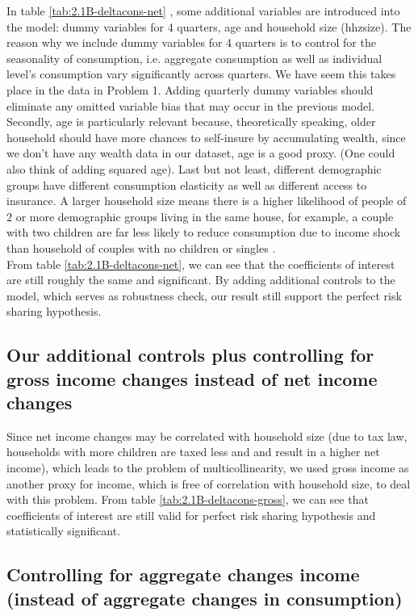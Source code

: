 \documentclass[12pt,a4paper]{article}
\begin{document}
In table \ref{tab:2.1B-deltacons-net} , some additional variables are introduced into the model: dummy variables for 4 quarters, age and household size (hhzsize). The reason why we include dummy variables for 4 quarters is to control for the seasonality of consumption, i.e. aggregate consumption as well as individual level's consumption vary significantly across quarters. We have seem this takes place in the data in Problem 1. Adding quarterly dummy variables should eliminate any omitted variable bias that may occur in the previous model. Secondly, age is particularly relevant because, theoretically speaking, older household should have more chances to self-insure by accumulating wealth, since we don't have any wealth data in our dataset, age is a good proxy. (One could also think of adding squared age). Last but not least, different demographic groups have different consumption elasticity as well as different access to insurance. A larger household size means there is a higher likelihood of people of 2 or more demographic groups living in the same house, for example, a couple with two children are far less likely to reduce consumption due to income shock than household of couples with no children or singles  
. \\

From table \ref{tab:2.1B-deltacons-net}, we can see that the coefficients of interest are still roughly the same and significant. By adding additional controls to the model, which serves as robustness check, our result still support the perfect risk sharing hypothesis.  

\subsection*{Our additional controls plus controlling for gross income changes instead of net income changes} 
Since net income changes may be correlated with household size (due to tax law, households with more children are taxed less and and result in a higher net income), which leads to the problem of multicollinearity, we used gross income as another proxy for income, which is free of correlation with household size, to deal with this problem. From table \ref{tab:2.1B-deltacons-gross}, we can see that coefficients of interest are still valid for perfect risk sharing hypothesis and statistically significant. 


\subsection*{Controlling for aggregate changes income (instead of aggregate changes in consumption)} 
\end{document}
